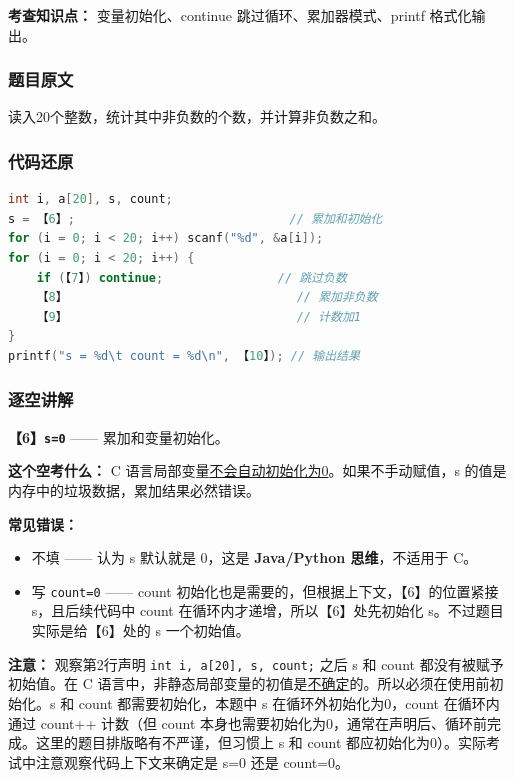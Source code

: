 \textbf{考查知识点：} 变量初始化、continue 跳过循环、累加器模式、printf 格式化输出。

\subsubsection{题目原文}

读入20个整数，统计其中非负数的个数，并计算非负数之和。

\subsubsection{代码还原}

\begin{lstlisting}[language=C]
int i, a[20], s, count;
s = 【6】;                              // 累加和初始化
for (i = 0; i < 20; i++) scanf("%d", &a[i]);
for (i = 0; i < 20; i++) {
    if (【7】) continue;                // 跳过负数
    【8】                                // 累加非负数
    【9】                                // 计数加1
}
printf("s = %d\t count = %d\n", 【10】); // 输出结果
\end{lstlisting}

\subsubsection{逐空讲解}

\textbf{【6】\texttt{s=0}} —— 累加和变量初始化。

\vspace{0.3em}
\textbf{这个空考什么：} C 语言局部变量\underline{不会自动初始化为0}。如果不手动赋值，s 的值是内存中的垃圾数据，累加结果必然错误。

\textbf{常见错误：}
\begin{itemize}
    \item 不填 —— 认为 s 默认就是 0，这是 \textbf{Java/Python 思维}，不适用于 C。
    \item 写 \texttt{count=0} —— count 初始化也是需要的，但根据上下文，【6】的位置紧接 s，且后续代码中 count 在循环内才递增，所以【6】处先初始化 s。不过题目实际是给【6】处的 s 一个初始值。
\end{itemize}

\textbf{注意：} 观察第2行声明 \texttt{int i, a[20], s, count;} 之后 s 和 count 都没有被赋予初始值。在 C 语言中，非静态局部变量的初值是\underline{不确定}的。所以必须在使用前初始化。s 和 count 都需要初始化，本题中 s 在循环外初始化为0，count 在循环内通过 count++ 计数（但 count 本身也需要初始化为0，通常在声明后、循环前完成。这里的题目排版略有不严谨，但习惯上 s 和 count 都应初始化为0）。实际考试中注意观察代码上下文来确定是 s=0 还是 count=0。

